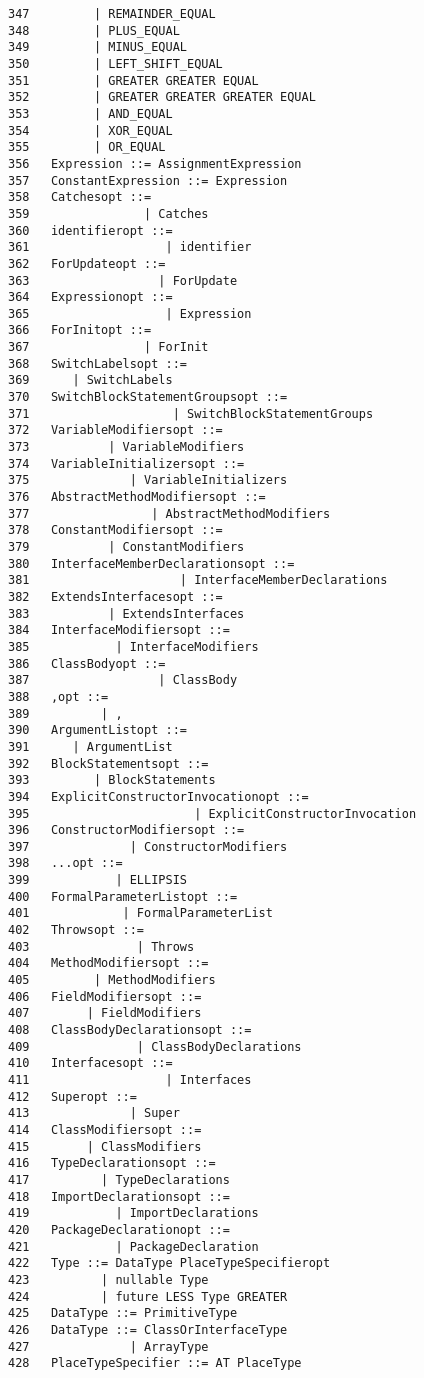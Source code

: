 {\begin{verbatim}
347         | REMAINDER_EQUAL
348         | PLUS_EQUAL
349         | MINUS_EQUAL
350         | LEFT_SHIFT_EQUAL
351         | GREATER GREATER EQUAL
352         | GREATER GREATER GREATER EQUAL
353         | AND_EQUAL
354         | XOR_EQUAL
355         | OR_EQUAL
356   Expression ::= AssignmentExpression
357   ConstantExpression ::= Expression
358   Catchesopt ::=
359                | Catches
360   identifieropt ::=
361                   | identifier
362   ForUpdateopt ::=
363                  | ForUpdate
364   Expressionopt ::=
365                   | Expression
366   ForInitopt ::=
367                | ForInit
368   SwitchLabelsopt ::=
369      | SwitchLabels
370   SwitchBlockStatementGroupsopt ::=
371                    | SwitchBlockStatementGroups
372   VariableModifiersopt ::=
373           | VariableModifiers
374   VariableInitializersopt ::=
375              | VariableInitializers
376   AbstractMethodModifiersopt ::=
377                 | AbstractMethodModifiers
378   ConstantModifiersopt ::=
379           | ConstantModifiers
380   InterfaceMemberDeclarationsopt ::=
381                     | InterfaceMemberDeclarations
382   ExtendsInterfacesopt ::=
383           | ExtendsInterfaces
384   InterfaceModifiersopt ::=
385            | InterfaceModifiers
386   ClassBodyopt ::=
387                  | ClassBody
388   ,opt ::=
389          | ,
390   ArgumentListopt ::=
391      | ArgumentList
392   BlockStatementsopt ::=
393         | BlockStatements
394   ExplicitConstructorInvocationopt ::=
395                       | ExplicitConstructorInvocation
396   ConstructorModifiersopt ::=
397              | ConstructorModifiers
398   ...opt ::=
399            | ELLIPSIS
400   FormalParameterListopt ::=
401             | FormalParameterList
402   Throwsopt ::=
403               | Throws
404   MethodModifiersopt ::=
405         | MethodModifiers
406   FieldModifiersopt ::=
407        | FieldModifiers
408   ClassBodyDeclarationsopt ::=
409               | ClassBodyDeclarations
410   Interfacesopt ::=
411                   | Interfaces
412   Superopt ::=
413              | Super
414   ClassModifiersopt ::=
415        | ClassModifiers
416   TypeDeclarationsopt ::=
417          | TypeDeclarations
418   ImportDeclarationsopt ::=
419            | ImportDeclarations
420   PackageDeclarationopt ::=
421            | PackageDeclaration
422   Type ::= DataType PlaceTypeSpecifieropt
423          | nullable Type
424          | future LESS Type GREATER
425   DataType ::= PrimitiveType
426   DataType ::= ClassOrInterfaceType
427              | ArrayType
428   PlaceTypeSpecifier ::= AT PlaceType

\end{verbatim}}
